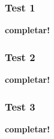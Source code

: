 \vspace*{0.3cm}

\subsubsection{Test 1}

\vspace*{0.3cm}

\textbf{completar!}


\newpage
\subsubsection{Test 2}

\vspace*{0.3cm}

\textbf{completar!}


\newpage
\subsubsection{Test 3}

\vspace*{0.3cm}

\textbf{completar!}
